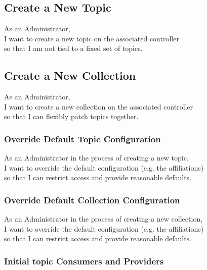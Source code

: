 \subsection{Create a New Topic}\label{sec:create-topic}

As an Administrator,\\
I want to create a new topic on the associated controller\\
so that I am not tied to a fixed set of topics.

\subsection{Create a New Collection}\label{sec:create-collection}

As an Administrator,\\
I want to create a new collection on the associated controller\\
so that I can flexibly patch topics together.

\subsubsection{Override Default Topic Configuration}\label{sec:requirement-topic-default-configuration}

As an Administrator in the process of creating a new topic,\\
I want to override the default configuration (e.g. the affiliations) \\
so that I can restrict access and provide reasonable defaults.

\subsubsection{Override Default Collection Configuration}\label{sec:requirement-collection-default-configuration}

As an Administrator in the process of creating a new collection,\\
I want to override the default configuration (e.g. the affiliations) \\
so that I can restrict access and provide reasonable defaults.

\subsubsection{Initial topic Consumers and Providers}\label{sec:requirement-initial-topic-consumer-provider}

